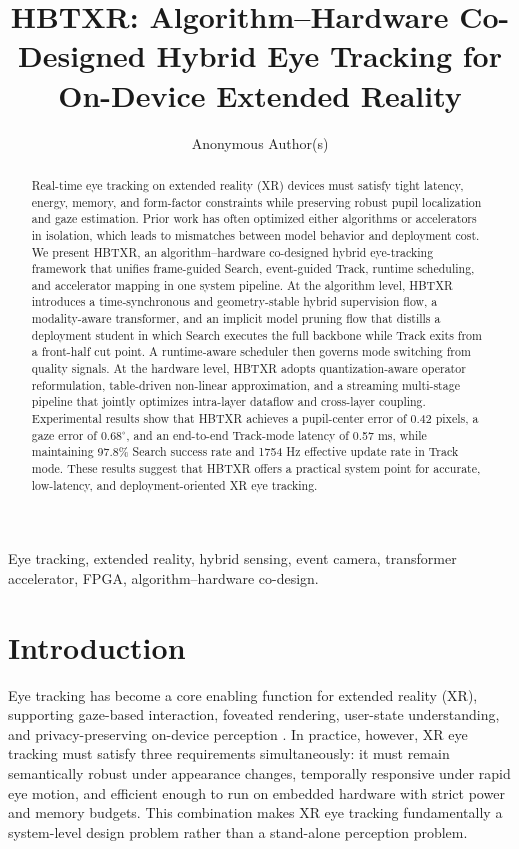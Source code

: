 \documentclass[journal]{IEEEtran}
\title{HBTXR: Algorithm--Hardware Co-Designed Hybrid Eye Tracking for On-Device Extended Reality}
\author{Anonymous Author(s)}
\begin{document}
\maketitle

\begin{abstract}
Real-time eye tracking on extended reality (XR) devices must satisfy tight latency, energy, memory, and form-factor constraints while preserving robust pupil localization and gaze estimation. Prior work has often optimized either algorithms or accelerators in isolation, which leads to mismatches between model behavior and deployment cost. We present HBTXR, an algorithm--hardware co-designed hybrid eye-tracking framework that unifies frame-guided Search, event-guided Track, runtime scheduling, and accelerator mapping in one system pipeline. At the algorithm level, HBTXR introduces a time-synchronous and geometry-stable hybrid supervision flow, a modality-aware transformer, and an implicit model pruning flow that distills a deployment student in which Search executes the full backbone while Track exits from a front-half cut point. A runtime-aware scheduler then governs mode switching from quality signals. At the hardware level, HBTXR adopts quantization-aware operator reformulation, table-driven non-linear approximation, and a streaming multi-stage pipeline that jointly optimizes intra-layer dataflow and cross-layer coupling. Experimental results show that HBTXR achieves a pupil-center error of 0.42 pixels, a gaze error of $0.68^{\circ}$, and an end-to-end Track-mode latency of 0.57 ms, while maintaining 97.8\% Search success rate and 1754 Hz effective update rate in Track mode. These results suggest that HBTXR offers a practical system point for accurate, low-latency, and deployment-oriented XR eye tracking.
\end{abstract}

\begin{IEEEkeywords}
Eye tracking, extended reality, hybrid sensing, event camera, transformer accelerator, FPGA, algorithm--hardware co-design.
\end{IEEEkeywords}

\section{Introduction}
Eye tracking has become a core enabling function for extended reality (XR), supporting gaze-based interaction, foveated rendering, user-state understanding, and privacy-preserving on-device perception \cite{ref1,ref2}. In practice, however, XR eye tracking must satisfy three requirements simultaneously: it must remain semantically robust under appearance changes, temporally responsive under rapid eye motion, and efficient enough to run on embedded hardware with strict power and memory budgets. This combination makes XR eye tracking fundamentally a system-level design problem rather than a stand-alone perception problem.
\end{document}
